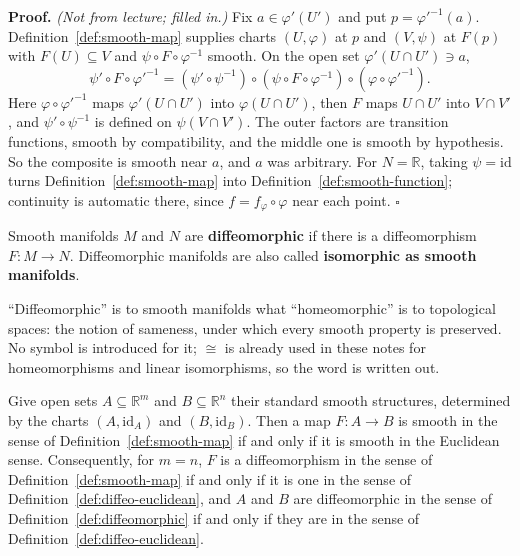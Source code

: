 \documentclass[11pt]{report}
\makeatletter
\newcounter{defcounter}[section]
\newcounter{thmcounter}[section]
\renewenvironment{proof}[1][Proof]{\noindent\textbf{#1.} }{\hfill$\square$\par\vspace{5pt}}
\newcommand{\thmlabel}[1]{\edef\@currentlabel{\arabic{section}.\arabic{thmcounter}}\label{#1}}
\newcommand{\deflabel}[1]{\edef\@currentlabel{\arabic{section}.\arabic{defcounter}}\label{#1}}
\newcommand{\leeref}[1]{\par\smallskip{\raggedleft\footnotesize\textsc{Lee}:\ #1\par}}
\makeatother
\begin{document}
\begin{proof}
\textit{(Not from lecture; filled in.)} Fix $a \in \varphi'(U')$ and put $p = \varphi'^{-1}(a)$. Definition~\ref{def:smooth-map} supplies charts $(U,\varphi)$ at $p$ and $(V,\psi)$ at $F(p)$ with $F(U) \subseteq V$ and $\psi \circ F \circ \varphi^{-1}$ smooth. On the open set $\varphi'(U \cap U') \ni a$,
\[
\psi' \circ F \circ \varphi'^{-1} = (\psi' \circ \psi^{-1}) \circ (\psi \circ F \circ \varphi^{-1}) \circ (\varphi \circ \varphi'^{-1}).
\]
Here $\varphi \circ \varphi'^{-1}$ maps $\varphi'(U \cap U')$ into $\varphi(U \cap U')$, then $F$ maps $U \cap U'$ into $V \cap V'$, and $\psi' \circ \psi^{-1}$ is defined on $\psi(V \cap V')$. The outer factors are transition functions, smooth by compatibility, and the middle one is smooth by hypothesis. So the composite is smooth near $a$, and $a$ was arbitrary. For $N = \mathbb{R}$, taking $\psi = \mathrm{id}$ turns Definition~\ref{def:smooth-map} into Definition~\ref{def:smooth-function}; continuity is automatic there, since $f = f_\varphi \circ \varphi$ near each point.
\end{proof}

\begin{defbox}\deflabel{def:diffeomorphic}
Smooth manifolds $M$ and $N$ are \textbf{diffeomorphic} if there is a diffeomorphism $F : M \to N$. Diffeomorphic manifolds are also called \textbf{isomorphic as smooth manifolds}.
\leeref{Ch.~2, \emph{Diffeomorphisms}}
\end{defbox}

\begin{rembox}\label{rem:smooth-structures-8}
``Diffeomorphic'' is to smooth manifolds what ``homeomorphic'' is to topological spaces: the notion of sameness, under which every smooth property is preserved. No symbol is introduced for it; $\cong$ is already used in these notes for homeomorphisms and linear isomorphisms, so the word is written out.
\end{rembox}

\begin{propbox}\thmlabel{prop:diffeo-agree}
Give open sets $A \subseteq \mathbb{R}^m$ and $B \subseteq \mathbb{R}^n$ their standard smooth structures, determined by the charts $(A, \mathrm{id}_A)$ and $(B, \mathrm{id}_B)$. Then a map $F : A \to B$ is smooth in the sense of Definition~\ref{def:smooth-map} if and only if it is smooth in the Euclidean sense. Consequently, for $m = n$, $F$ is a diffeomorphism in the sense of Definition~\ref{def:smooth-map} if and only if it is one in the sense of Definition~\ref{def:diffeo-euclidean}, and $A$ and $B$ are diffeomorphic in the sense of Definition~\ref{def:diffeomorphic} if and only if they are in the sense of Definition~\ref{def:diffeo-euclidean}.
\end{propbox}
\end{document}
